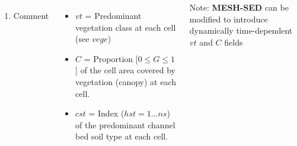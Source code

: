 \documentclass{beamer}
\newcommand{\ms}{\textbf{MESH-SED} }
\newcounter{ResumeEnumerate}
\begin{document}
\begin{frame}
\begin{columns}
{\begin{enumerate}[start=\numexpr\value{ResumeEnumerate}+1, label=Line \arabic*]
\begin{minipage}[t]{0.1\linewidth}
\begin{flushright}
$$\begin{matrix}
\end{matrix}
$$
\end{flushright}
\end{minipage}
\item Comment
\end{enumerate}
\setcounter{ResumeEnumerate}{\value{enumi}}
}
{\scriptsize 
\begin{itemize}[label={}]
\item $vt$ = Predominant vegetation class at each cell (see $vege$)
\item $C$ = Proportion [$0\leq G \leq 1$] of the cell area covered by vegetation (canopy) at each cell. 
\item $cst$ = Index ($hst = 1 ... ns$) of the predominant channel bed soil type at each cell.
\end{itemize}
Note: \ms can be modified to introduce dynamically time-dependent $vt$ and $C$ fields
}
\end{columns}
\end{frame}
\end{document}
